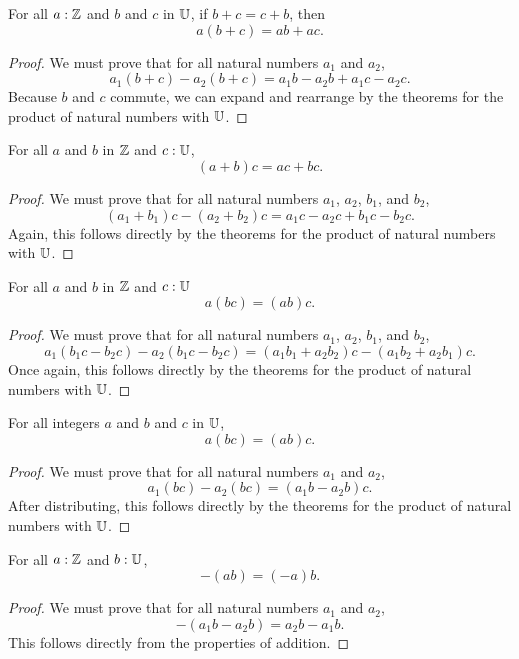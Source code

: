 \documentclass[../../math.tex]{subfiles}
\begin{document}
\begin{theorem}
    For all $a : \mathbb{Z}$ and $b$ and $c$ in $\mathbb{U}$, if $b + c = c + b$, then
    \[
        a(b + c) = ab + ac.
    \]
\end{theorem}
\begin{proof}
    We must prove that for all natural numbers $a_1$ and $a_2$,
    \[
        a_1(b + c) - a_2(b + c) = a_1b - a_2b + a_1c - a_2c.
    \]
    Because $b$ and $c$ commute, we can expand and rearrange by the theorems for
    the product of natural numbers with $\mathbb{U}$.
\end{proof}

\begin{theorem}
    For all $a$ and $b$ in $\mathbb{Z}$ and $c : \mathbb{U}$,
    \[
        (a + b)c = ac + bc.
    \]
\end{theorem}
\begin{proof}
    We must prove that for all natural numbers $a_1$, $a_2$, $b_1$, and $b_2$,
    \[
        (a_1 + b_1)c - (a_2 + b_2)c = a_1c - a_2 c + b_1c - b_2c.
    \]
    Again, this follows directly by the theorems for the product of natural
    numbers with $\mathbb{U}$.
\end{proof}

\begin{theorem}
    For all $a$ and $b$ in $\mathbb{Z}$ and $c : \mathbb{U}$
    \[
        a(bc) = (ab)c.
    \]
\end{theorem}
\begin{proof}
    We must prove that for all natural numbers $a_1$, $a_2$, $b_1$, and $b_2$,
    \[
        a_1(b_1c - b_2c) - a_2(b_1c - b_2c) =
        (a_1b_1 + a_2b_2)c - (a_1b_2 + a_2b_1)c.
    \]
    Once again, this follows directly by the theorems for the product of natural
    numbers with $\mathbb{U}$.
\end{proof}

\begin{theorem}
    For all integers $a$ and $b$ and $c$ in $\mathbb{U}$,
    \[
        a(bc) = (ab)c.
    \]
\end{theorem}
\begin{proof}
    We must prove that for all natural numbers $a_1$ and $a_2$,
    \[
        a_1(bc) - a_2(bc) =
        (a_1b - a_2b)c.
    \]
    After distributing, this follows directly by the theorems for the product of
    natural numbers with $\mathbb{U}$.
\end{proof}

\begin{theorem}
    For all $a : \mathbb{Z}$ and $b : \mathbb{U}$,
    \[
        -(ab) = (-a)b.
    \]
\end{theorem}
\begin{proof}
    We must prove that for all natural numbers $a_1$ and $a_2$,
    \[
        -(a_1b - a_2b) = a_2b - a_1b.
    \]
    This follows directly from the properties of addition.
\end{proof}
\end{document}
